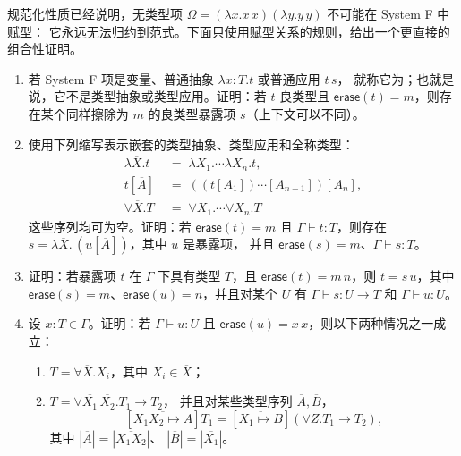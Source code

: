 \begin{exercise}[\(\star\star\star\star\)]
\label{ex:23.6.3}
规范化性质已经说明，无类型项
\(\Omega=(\lambda x.x\,x)(\lambda y.y\,y)\) 不可能在 System F 中赋型：
它永远无法归约到范式。下面只使用赋型关系的规则，给出一个更直接的组合性证明。
\begin{enumerate}
  \item 若 System F 项是变量、普通抽象 \(\lambda x:T.t\) 或普通应用 \(t\,s\)，
        就称它为；也就是说，它不是类型抽象或类型应用。证明：若
        \(t\) 良类型且 \(\mathsf{erase}(t)=m\)，则存在某个同样擦除为 \(m\)
        的良类型暴露项 \(s\)（上下文可以不同）。
  \item 使用下列缩写表示嵌套的类型抽象、类型应用和全称类型：
        \[
        \begin{aligned}
        \lambda\overline X.t
          &\;=\;\lambda X_1.\cdots\lambda X_n.t,\\
        t[\overline A]
          &\;=\;((t[A_1])\cdots[A_{n-1}])[A_n],\\
        \forall\overline X.T
          &\;=\;\forall X_1.\cdots\forall X_n.T
        \end{aligned}
        \]
        这些序列均可为空。证明：若 \(\mathsf{erase}(t)=m\) 且
        \(\Gamma\vdash t:T\)，则存在
        \(s=\lambda\overline X.\,(u[\overline A])\)，其中 \(u\) 是暴露项，
        并且 \(\mathsf{erase}(s)=m\)、\(\Gamma\vdash s:T\)。
  \item 证明：若暴露项 \(t\) 在 \(\Gamma\) 下具有类型 \(T\)，且
        \(\mathsf{erase}(t)=m\,n\)，则 \(t=s\,u\)，其中
        \(\mathsf{erase}(s)=m\)、\(\mathsf{erase}(u)=n\)，并且对某个 \(U\)
        有 \(\Gamma\vdash s:U\to T\) 和 \(\Gamma\vdash u:U\)。
  \item 设 \(x:T\in\Gamma\)。证明：若 \(\Gamma\vdash u:U\) 且
        \(\mathsf{erase}(u)=x\,x\)，则以下两种情况之一成立：
        \begin{enumerate}
          \item \(T=\forall\overline X.X_i\)，其中
                \(X_i\in\overline X\)；
          \item \(T=\forall\overline{X_1}\,\overline{X_2}.T_1\to T_2\)，
                并且对某些类型序列 \(\overline A,\overline B\)，
                \[
                [\overline{X_1X_2\mapsto A}]T_1
                =[\overline{X_1\mapsto B}]
                  (\forall Z.T_1\to T_2),
                \]
                其中 \(|\overline A|=|\overline{X_1X_2}|\)、
                \(|\overline B|=|\overline{X_1}|\)。
        \end{enumerate}

\end{enumerate}
\end{exercise}
